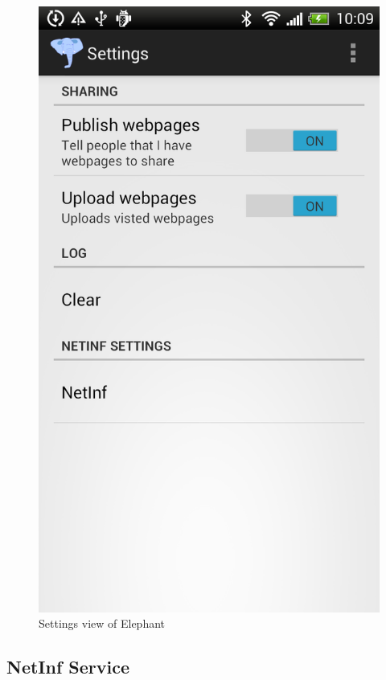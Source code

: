 \begin{figure}[!h]
\centering
\includegraphics[scale=0.2]{img/ele_settings.png}
\caption{Settings view of Elephant}\label{fig:ele_settings}
\end{figure}


\subsection{NetInf Service}
